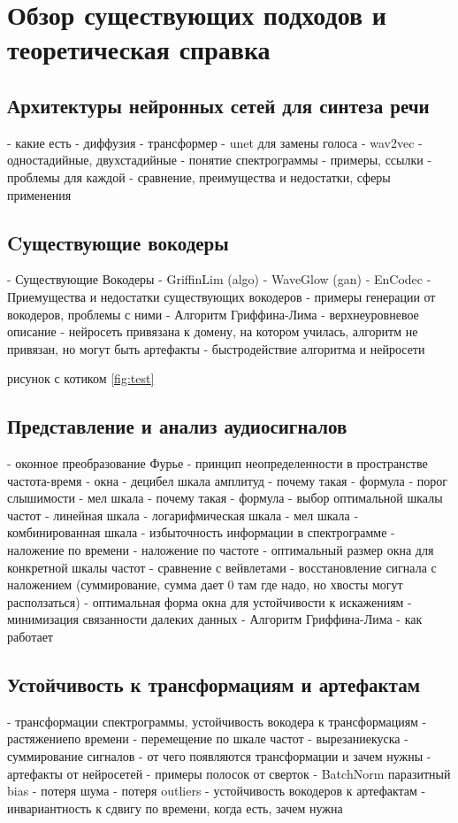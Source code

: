 \chapter{Обзор существующих подходов и теоретическая справка}
\label{cha:ch_1}


\section{Архитектуры нейронных сетей для синтеза речи}
 - какие есть
   - диффузия
   - трансформер
   - unet для замены голоса
   - wav2vec
   - одностадийные, двухстадийные
 - понятие спектрограммы
 - примеры, ссылки
 - проблемы для каждой
 - сравнение, преимущества и недостатки, сферы применения

\section{Cуществующие вокодеры}
 - Существующие Вокодеры
  - GriffinLim (algo) \cite{1164317}
  - WaveGlow (gan)
  - EnCodec
 - Приемущества и недостатки существующих вокодеров 
 - примеры генерации от вокодеров, проблемы с ними
 - Алгоритм Гриффина-Лима
  - верхнеуровневое описание
 - нейросеть привязана к домену, на котором училась, алгоритм не привязан, но могут быть артефакты
 - быстродействие алгоритма и нейросети

рисунок с котиком \ref{fig:test}

\section{Представление и анализ аудиосигналов}
 - оконное преобразование Фурье
 - принцип неопределенности в пространстве частота-время
 - окна
 - децибел шкала амплитуд
   - почему такая
   - формула
   - порог слышимости
 - мел шкала
   - почему такая
   - формула
 - выбор оптимальной шкалы частот
  - линейная шкала
  - логарифмическая шкала
  - мел шкала
  - комбинированная шкала
 - избыточность информации в спектрограмме
 - наложение по времени
 - наложение по частоте
 - оптимальный размер окна для конкретной шкалы частот
 - сравнение с вейвлетами
 - восстановление сигнала с наложением (суммирование, сумма дает 0 там где надо, но хвосты могут расползаться)
 - оптимальная форма окна для устойчивости к искажениям
   - минимизация связанности далеких данных
 - Алгоритм Гриффина-Лима
    - как работает

 \section{Устойчивость к трансформациям и артефактам}
 - трансформации спектрограммы, устойчивость вокодера к трансформациям
   - растяжение по времени
   - перемещение по шкале частот
   - вырезание куска
   - суммирование сигналов
 - от чего появляются трансформации и зачем нужны
 - артефакты от нейросетей
   - примеры полосок от сверток
   - BatchNorm паразитный bias
   - потеря шума
   - потеря outliers
 - устойчивость вокодеров к артефактам
 - инвариантность к сдвигу по времени, когда есть, зачем нужна

